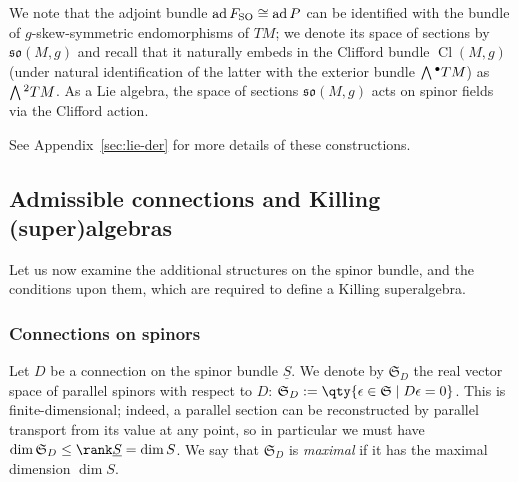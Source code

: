\documentclass[pdftex]{sigma}
\numberwithin{equation}{section}
\newcommand{\fso}{\mathfrak{so}}
\newcommand{\fS}{\mathfrak{S}}
\newcommand{\Sbundle}{\underline{S}}
\newcommand{\Wedge}{\mathchoice{{\textstyle\bigwedge}}{\bigwedge}{\bigwedge}{\bigwedge}}	%
\newcommand{\1}{\mathbbm{1}}
\DeclareMathOperator{\Cl}{Cl}
\DeclareMathOperator{\ad}{ad}
\begin{document}
We note that the adjoint bundle $\ad F_{\rm SO}\cong\ad P$ can be identified with the bundle of $g$-skew-symmetric endomorphisms of $TM$; we denote its space of sections by $\fso(M,g)$ and recall that it naturally embeds in the Clifford bundle $\Cl(M,g)$ (under natural identification of the latter with the exterior bundle $\Wedge^\bullet TM$) as $\Wedge^2 TM$. As a Lie algebra, the space of sections $\fso(M,g)$ acts on spinor fields via the Clifford action.

See Appendix~\ref{sec:lie-der} for more details of these constructions.

\subsection{Admissible connections and Killing (super)algebras}
\label{sec:admissible-ksa}

Let us now examine the additional structures on the spinor bundle, and the conditions upon them, which are required to define a Killing superalgebra.

\subsubsection{Connections on spinors}

Let $D$ be a connection on the spinor bundle $\Sbundle$. We denote by $\fS_D$ the real vector space of parallel spinors with respect to $D$:
$\fS_D := \qty{\epsilon\in\fS\mid D\epsilon = 0}$.
This is finite-dimensional; indeed, a parallel section can be reconstructed by parallel transport from its value at any point, so in particular we must have $\dim\fS_D\leq\rank\Sbundle=\dim S$. We say that $\fS_D$ is \emph{maximal} if it has the maximal dimension $\dim S$.
\end{document}
